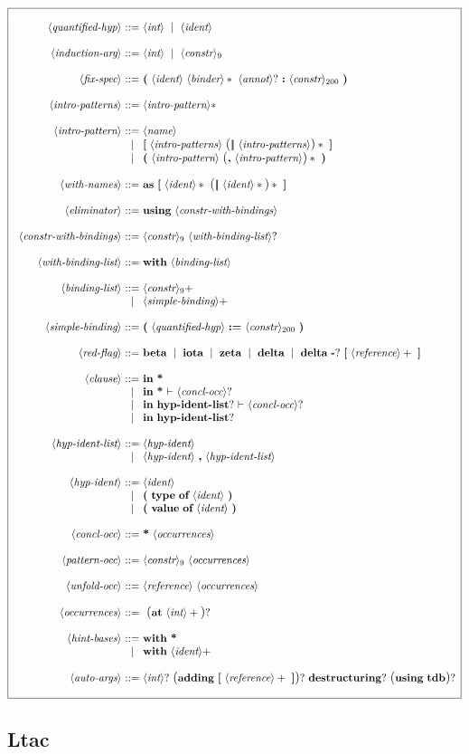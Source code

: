 \documentclass{article}
\makeatletter
\def\bfbar{\ensuremath{|\hskip -0.22em{}|\hskip -0.24em{}|}}
\def\TERMbar{\bfbar}
\def\GR#1{\text{\large(}#1\text{\large)}}
\def\NT#1{\langle\textit{#1}\rangle}
\def\TERM#1{{\bf\textrm{\bf #1}}}
\def\KWD#1{\TERM{#1}}
\def\STAR#1{#1*}
\def\STARGR#1{\GR{#1}*}
\def\PLUS#1{#1+}
\def\OPT#1{#1?}
\def\OPTGR#1{\GR{#1}?}
\newenvironment{cadre}
        {\begin{array}{|c|}\hline\\}
        {\\\\\hline\end{array}}
\newenvironment{rulebox}
        {$$\begin{cadre}\begin{array}{r@{~}c@{~}l@{}l@{}r}}
        {\end{array}\end{cadre}$$}
\def\DEFNT#1{\NT{#1} & ::= &}
\def\SEPDEF{\\\\}
\def\nlsep{\\&|&}
\newenvironment{rules}
        {\begin{center}\begin{rulebox}}
        {\end{rulebox}\end{center}}
\makeatother
\begin{document}
\begin{rules}
\DEFNT{quantified-hyp}
       \NT{int}~\mid~\NT{ident}
\SEPDEF
\DEFNT{induction-arg}
       \NT{int}~\mid~\tacconstr
\SEPDEF
\DEFNT{fix-spec}
       \KWD{(}~\NT{ident}~\STAR{\NT{binder}}~\OPT{\NT{annot}}
       ~\KWD{:}~\taclconstr~\KWD{)}
\SEPDEF
\DEFNT{intro-patterns}
       \STAR{\NT{intro-pattern}}
\SEPDEF
\DEFNT{intro-pattern}
       \NT{name}
\nlsep \TERM{[}~\NT{intro-patterns}~\STARGR{\TERMbar~\NT{intro-patterns}}
       ~\TERM{]}
\nlsep \KWD{(}~\NT{intro-pattern}~\STARGR{\KWD{,}~\NT{intro-pattern}}
       ~\KWD{)}
\SEPDEF
\DEFNT{with-names}
       \KWD{as}~\TERM{[}~\STAR{\NT{ident}}~\STARGR{\TERMbar~\STAR{\NT{ident}}}
       ~\TERM{]}
\SEPDEF
\DEFNT{eliminator}
       \TERM{using}~\NT{constr-with-bindings}
\SEPDEF
\DEFNT{constr-with-bindings}
       \tacconstr~\OPT{\NT{with-binding-list}}
\SEPDEF
\DEFNT{with-binding-list}
       \KWD{with}~\NT{binding-list}
\SEPDEF
\DEFNT{binding-list}
       \PLUS{\tacconstr}
\nlsep \PLUS{\NT{simple-binding}}
\SEPDEF
\DEFNT{simple-binding}
       \KWD{(}~\NT{quantified-hyp}~\KWD{:=}~\taclconstr~\KWD{)}
\SEPDEF
\DEFNT{red-flag}
       \TERM{beta} ~\mid~ \TERM{iota} ~\mid~ \TERM{zeta}
       ~\mid~ \TERM{delta} ~\mid~
       \TERM{delta}~\OPT{\TERM{-}}~\TERM{[}~\PLUS{\NT{reference}}~\TERM{]}
\SEPDEF
\DEFNT{clause}
       \KWD{in}~\TERM{*}
\nlsep \KWD{in}~\TERM{*}~\KWD{$\vdash$}~\OPT{\NT{concl-occ}}
\nlsep \KWD{in}~\OPT{\TERM{hyp-ident-list}} ~\KWD{$\vdash$} ~\OPT{\NT{concl-occ}}
\nlsep \KWD{in}~\OPT{\TERM{hyp-ident-list}}
\SEPDEF
\DEFNT{hyp-ident-list}
       \NT{hyp-ident}
\nlsep \NT{hyp-ident}~\KWD{,}~\NT{hyp-ident-list}
\SEPDEF
\DEFNT{hyp-ident}
       \NT{ident}
\nlsep \KWD{(}~\TERM{type}~\TERM{of}~\NT{ident}~\KWD{)}
\nlsep \KWD{(}~\TERM{value}~\TERM{of}~\NT{ident}~\KWD{)}
\SEPDEF
\DEFNT{concl-occ}
       \TERM{*} ~\NT{occurrences}
\SEPDEF
\DEFNT{pattern-occ}
       \tacconstr ~\NT{occurrences}
\SEPDEF
\DEFNT{unfold-occ}
       \NT{reference}~\NT{occurrences}
\SEPDEF
\DEFNT{occurrences}
       ~\OPTGR{\KWD{at}~\PLUS{\NT{int}}}
\SEPDEF
\DEFNT{hint-bases}
       \KWD{with}~\TERM{*}
\nlsep \KWD{with}~\PLUS{\NT{ident}}
\SEPDEF
\DEFNT{auto-args}
       \OPT{\NT{int}}~\OPTGR{\TERM{adding}~\TERM{[}~\PLUS{\NT{reference}}
       ~\TERM{]}}~\OPT{\TERM{destructuring}}~\OPTGR{\TERM{using}~\TERM{tdb}}
\end{rules}

\subsection{Ltac}
\end{document}
